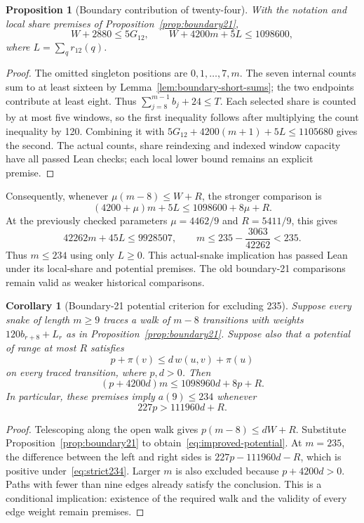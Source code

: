 \documentclass[11pt,a4paper]{article}
\newtheorem{proposition}[theorem]{Proposition}
\newtheorem{corollary}[theorem]{Corollary}
\theoremstyle{definition}
\theoremstyle{remark}
\begin{document}
\begin{proposition}[Boundary contribution of twenty-four]\label{prop:boundary24}
With the notation and local share premises of Proposition~\ref{prop:boundary21},
\[
\boxed{W+2880\le5G_{12},\qquad W+4200m+5L\le1098600,}
\]
where $L=\sum_qr_{12}(q)$.
\end{proposition}
\begin{proof}
The omitted singleton positions are $0,1,\ldots,7,m$. The seven internal
counts sum to at least sixteen by Lemma~\ref{lem:boundary-short-sums};
the two endpoints contribute at least eight. Thus
$\sum_{j=8}^{m-1}b_j+24\le T$.
Each selected share is counted by at most five windows, so the first
inequality follows after multiplying the count inequality by 120.
Combining it with $5G_{12}+4200(m+1)+5L\le1105680$ gives the second.
The actual counts, share reindexing and indexed window capacity have all
passed Lean checks; each local lower bound remains an explicit premise.
\end{proof}
Consequently, whenever $\mu(m-8)\le W+R$, the stronger comparison is
\begin{equation}\label{eq:boundary24-comparison}
\boxed{(4200+\mu)m+5L\le1098600+8\mu+R.}
\end{equation}
At the previously checked parameters $\mu=4462/9$ and $R=5411/9$,
this gives
\[
42262m+45L\le9928507,
\qquad m\le235-\frac{3063}{42262}<235.
\]
Thus $m\le234$ using only $L\ge0$. This actual-snake implication has
passed Lean under its local-share and potential premises. The old
boundary-21 comparisons remain valid as weaker historical comparisons.

\begin{corollary}[Boundary-21 potential criterion for excluding 235]\label{cor:potential234}
Suppose every snake of length $m\ge9$ traces a walk of $m-8$ transitions with weights $120b_{r+8}+L_r$ as in Proposition~\ref{prop:boundary21}. Suppose also that a potential of range at most $R$ satisfies
\[
p+\pi(v)\le d\,w(u,v)+\pi(u)
\]
on every traced transition, where $p,d>0$. Then
\begin{equation}\label{eq:improved-potential}
(p+4200d)m\le1098960d+8p+R.
\end{equation}
In particular, these premises imply $a(9)\le234$ whenever
\begin{equation}\label{eq:strict234}
227p>111960d+R.
\end{equation}
\end{corollary}
\begin{proof}
Telescoping along the open walk gives $p(m-8)\le dW+R$. Substitute Proposition~\ref{prop:boundary21} to obtain~\eqref{eq:improved-potential}. At $m=235$, the difference between the left and right sides is $227p-111960d-R$, which is positive under~\eqref{eq:strict234}. Larger $m$ is also excluded because $p+4200d>0$. Paths with fewer than nine edges already satisfy the conclusion. This is a conditional implication: existence of the required walk and the validity of every edge weight remain premises.
\end{proof}
\end{document}
